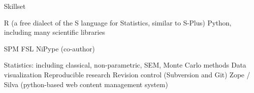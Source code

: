 \begin{rubric}{Skillset}

\entry* R (a free dialect of the S language for Statistics, similar to S-Plus)
\entry* Python, including many scientific libraries

\entry* SPM
\entry* FSL
\entry* NiPype (co-author)

\entry* Statistics: including classical, non-parametric, SEM, Monte Carlo methods
\entry* Data visualization
\entry* Reproducible research
\entry* Revision control (Subversion and Git)
\entry* Zope / Silva (python-based web content management system)

\end{rubric}
